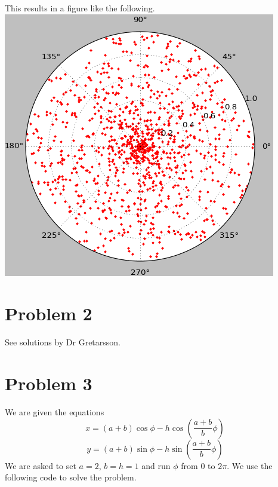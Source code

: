 \documentclass[11pt]{article}   %
\begin{document}
This results in a figure like the following.\\
\includegraphics[scale=0.75]{Hw1Fig2}

\section*{Problem 2}
See solutions by Dr Gretarsson.
\section*{Problem 3}
We are given the equations
\[
   x=(a+b)\cos{\phi}-h\cos{\left(\frac{a+b}{b}\phi\right)}
\]
\[
   y=(a+b)\sin{\phi}-h\sin{\left(\frac{a+b}{b}\phi\right)}
\]
We are asked to set $a=2$, $b=h=1$ and run $\phi$ from $0$ to $2\pi$. We use the following code to solve the problem.
\end{document}
